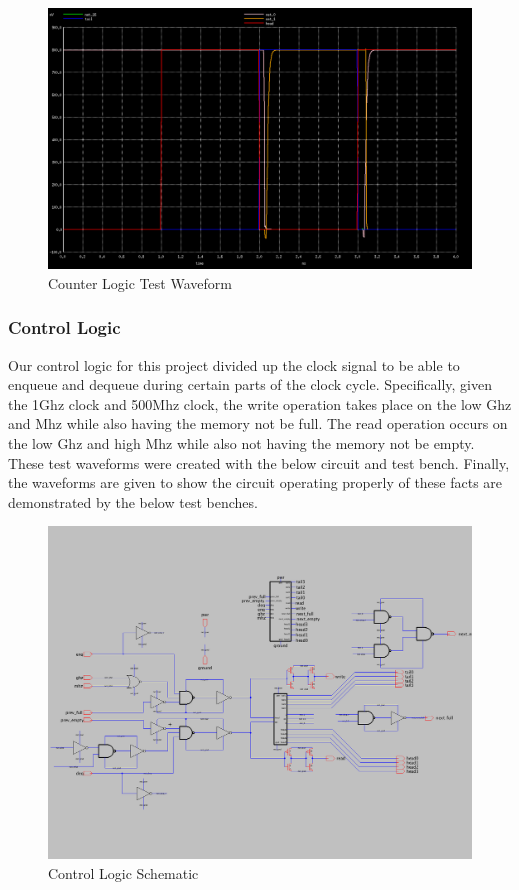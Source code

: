 \documentclass[a4paper]{article}
\begin{document}
\begin{figure}[H]
	\centering
	\includegraphics[scale=0.26]{counterLogicWaveform}
	\caption{Counter Logic Test Waveform}
	\label{fig:counterLogicWaveform}
\end{figure}


\subsubsection{Control Logic}
\label{sec:control_logic_design}

Our control logic for this project divided up the clock signal to be able to enqueue and dequeue during certain parts of the clock cycle. Specifically, given the 1Ghz clock and 500Mhz clock, the write operation takes place on the low Ghz and Mhz while also having the memory not be full. The read operation occurs on the low Ghz and high Mhz while also not having the memory not be empty. These test waveforms were created with the below circuit and test bench. Finally, the waveforms are given to show the circuit operating properly of these facts are demonstrated by the below test benches.

\begin{figure}[H]
	\centering
	\includegraphics[scale=0.26]{controlLogic}
	\caption{Control Logic Schematic}
	\label{fig:controlLogic}
\end{figure}
\end{document}
